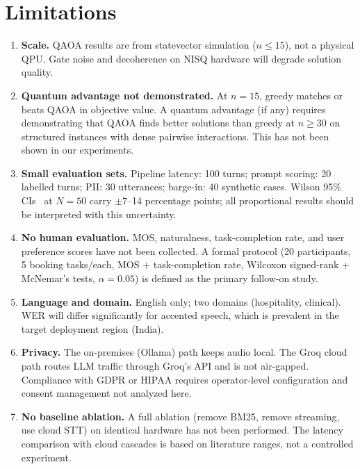 \documentclass[journal]{IEEEtran}
\begin{document}
\section{Limitations}

\begin{enumerate}
\item \textbf{Scale.} QAOA results are from statevector simulation
($n{\leq}15$), not a physical QPU. Gate noise and decoherence on NISQ
hardware will degrade solution quality.

\item \textbf{Quantum advantage not demonstrated.} At $n{=}15$, greedy
matches or beats QAOA in objective value. A quantum advantage (if any)
requires demonstrating that QAOA finds better solutions than greedy at
$n \geq 30$ on structured instances with dense pairwise interactions.
This has not been shown in our experiments.

\item \textbf{Small evaluation sets.} Pipeline latency: 100 turns;
prompt scoring: 20 labelled turns; PII: 30 utterances; barge-in: 40
synthetic cases. Wilson 95\% CIs~\cite{wilson1927} at $N{=}50$ carry
$\pm 7$--14 percentage points; all proportional results should be
interpreted with this uncertainty.

\item \textbf{No human evaluation.} MOS, naturalness, task-completion
rate, and user preference scores have not been collected. A formal
protocol (20 participants, 5 booking tasks/each, MOS + task-completion
rate, Wilcoxon signed-rank + McNemar's tests, $\alpha{=}0.05$) is
defined as the primary follow-on study.

\item \textbf{Language and domain.} English only; two domains
(hospitality, clinical). WER will differ significantly for accented
speech, which is prevalent in the target deployment region (India).

\item \textbf{Privacy.} The on-premises (Ollama) path keeps audio local.
The Groq cloud path routes LLM traffic through Groq's API and is not
air-gapped. Compliance with GDPR or HIPAA requires operator-level
configuration and consent management not analyzed here.

\item \textbf{No baseline ablation.} A full ablation (remove BM25,
remove streaming, use cloud STT) on identical hardware has not been
performed. The latency comparison with cloud cascades is based on
literature ranges, not a controlled experiment.
\end{enumerate}
\end{document}
